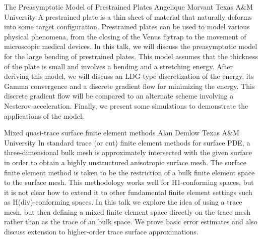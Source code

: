 \begin{addmargin}[2em]{0em}
\vspace{1.5ex}
\abs
{The Preasymptotic Model of Prestrained Plates}
{Angelique Morvant}
{Texas A\&M University}
{A prestrained plate is a thin sheet of material that naturally deforms into some target configuration. Prestrained plates can be used to model various physical phenomena, from the closing of the Venus flytrap to the movement of microscopic medical devices. In this talk, we will discuss the preasymptotic model for the large bending of prestrained plates. This model assumes that the thickness of the plate is small and involves a bending and a stretching energy. After deriving this model, we will discuss an LDG-type discretization of the energy, its Gamma convergence and a discrete gradient flow for minimizing the energy. This discrete gradient flow will be compared to an alternate scheme involving a Nesterov acceleration. Finally, we present some simulations to demonstrate the applications of the model.}


\vspace{1.5ex}
\abs
{Mixed quasi-trace surface finite element methods}
{Alan Demlow}
{Texas A\&M University}
{In standard trace (or cut) finite element methods for surface PDE, a three-dimensional bulk mesh is approximately intersected with the given surface in order to obtain a highly unstructured anisotropic surface mesh. The surface finite element method is taken to be the restriction of a bulk finite element space to the surface mesh. This methodology works well for H1-conforming spaces, but it is not clear how to extend it to other fundamental finite element settings such as H(div)-conforming spaces. In this talk we explore the idea of using a trace mesh, but then defining a mixed finite element space directly on the trace mesh rather than as the trace of an bulk space. We prove basic error estimates and also discuss extension to higher-order trace surface approximations.}



\end{addmargin}
